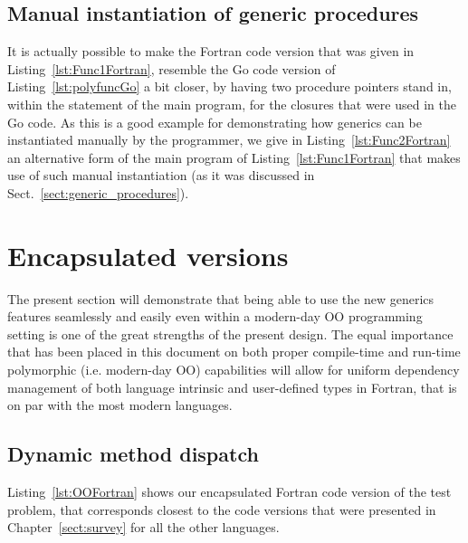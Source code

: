 \documentclass[11pt,oneside]{report}
\newcommand{\code}[1]{{\selectfont\ttfamily{#1}}}
\begin{document}
\subsection{Manual instantiation of generic procedures}

It is actually possible to make the Fortran code version that was
given in Listing~\ref{lst:Func1Fortran}, resemble the Go code version
of Listing~\ref{lst:polyfuncGo} a bit closer, by having two procedure
pointers stand in, within the \code{select case} statement of the main
program, for the closures that were used in the Go code. As this is a
good example for demonstrating how generics can be instantiated
manually by the programmer, we give in Listing~\ref{lst:Func2Fortran}
an alternative form of the main program of
Listing~\ref{lst:Func1Fortran} that makes use of such manual
instantiation (as it was discussed in
Sect.~\ref{sect:generic_procedures}).





\section{Encapsulated versions}

The present section will demonstrate that being able to use the new
generics features seamlessly and easily even within a modern-day OO
programming setting is one of the great strengths of the present
design. The equal importance that has been placed in this document on
both proper compile-time and run-time polymorphic (i.e. modern-day OO)
capabilities will allow for uniform dependency management of both
language intrinsic and user-defined types in Fortran, that is on par
with the most modern languages.

\subsection{Dynamic method dispatch}

Listing~\ref{lst:OOFortran} shows our encapsulated Fortran code
version of the test problem, that corresponds closest to the code
versions that were presented in Chapter~\ref{sect:survey} for all the
other languages.
\end{document}

